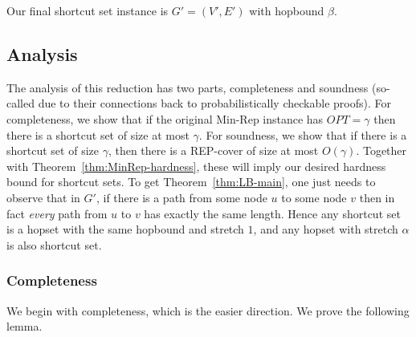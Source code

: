 \documentclass{article}
\theoremstyle{definition}
\theoremstyle{remark}
\begin{document}
Our final shortcut set instance is $G' = (V', E')$ with hopbound $\beta$.

\subsection{Analysis}
The analysis of this reduction has two parts, completeness and soundness (so-called due to their connections back to probabilistically checkable proofs).  For completeness, we show that if the original Min-Rep instance has $OPT = \gamma$ then there is a shortcut set of size at most $\gamma$.  For soundness, we show that if there is a shortcut set of size $\gamma$, then there is a REP-cover of size at most $O(\gamma)$.  Together with Theorem~\ref{thm:MinRep-hardness}, these will imply our desired hardness bound for shortcut sets.  To get Theorem~\ref{thm:LB-main}, one just needs to observe that in $G'$, if there is a path from some node $u$ to some node $v$ then in fact \emph{every} path from $u$ to $v$ has exactly the same length.  Hence any shortcut set is a hopset with the same hopbound and stretch $1$, and any hopset with stretch $\alpha$ is also shortcut set.

\subsubsection{Completeness}
We begin with completeness, which is the easier direction.  We prove the following lemma.
\end{document}
